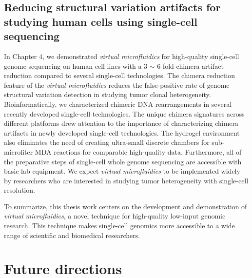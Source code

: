 \subsection{Reducing structural variation artifacts for studying human cells using single-cell sequencing}
In Chapter 4, we demonstrated \textit{virtual microfluidics} for high-quality single-cell genome sequencing on human cell lines with a 3 $\sim$ 6 fold chimera artifact reduction compared to several single-cell technologies. The chimera reduction feature of the \textit{virtual microfluidics} reduces the false-positive rate of genome structural variation detection in studying tumor clonal heterogeneity. Bioinformatically, we characterized chimeric DNA rearrangements in several recently developed single-cell technologies. The unique chimera signatures across different platforms drew attention to the importance of characterizing chimera artifacts in newly developed single-cell technologies. The hydrogel environment also eliminates the need of creating ultra-small discrete chambers for sub-microliter MDA reactions for comparable high-quality data. Furthermore, all of the preparative steps of single-cell whole genome sequencing are accessible with basic lab equipment. We expect \textit{virtual microfluidics} to be implemented widely by researchers who are interested in studying tumor heterogeneity with single-cell resolution.  

To summarize, this thesis work centers on the development and demonstration of \textit{virtual microfluidics}, a novel technique for high-quality low-input genomic research. This technique makes single-cell genomics more accessible to a wide range of scientific and biomedical researchers. 

\section{Future directions}
